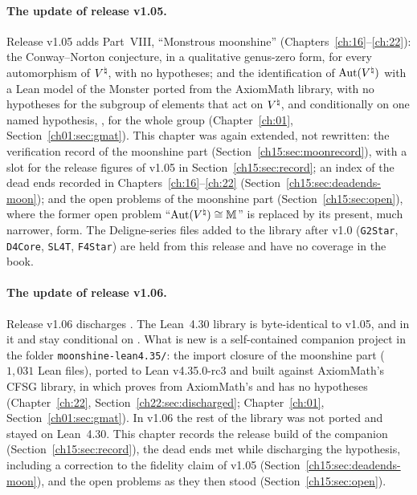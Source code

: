 \paragraph{The update of release v1.05.} Release v1.05 adds Part~VIII, ``Monstrous moonshine''
(Chapters~\ref{ch:16}--\ref{ch:22}): the Conway--Norton conjecture, in a qualitative genus-zero form, for every
automorphism of ${V^{\natural}}$, with no hypotheses; and the identification of $\operatorname{Aut}({V^{\natural}})$ with a Lean model of the Monster
ported from the AxiomMath library, with no hypotheses for the subgroup of elements that act on ${V^{\natural}}$, and conditionally
on one named hypothesis, , for the whole group (Chapter~\ref{ch:01}, Section~\ref{ch01:sec:gmat}). This
chapter was again extended, not rewritten: the verification record of the moonshine part
(Section~\ref{ch15:sec:moonrecord}), with a slot for the release figures of v1.05 in Section~\ref{ch15:sec:record}; an
index of the dead ends recorded in Chapters~\ref{ch:16}--\ref{ch:22} (Section~\ref{ch15:sec:deadends-moon}); and the open
problems of the moonshine part (Section~\ref{ch15:sec:open}), where the former open problem ``$\operatorname{Aut}({V^{\natural}})\cong\mathbb M$''
is replaced by its present, much narrower, form. The Deligne-series files added to the library after v1.0 (\texttt{G2Star},
\texttt{D4Core}, \texttt{SL4T}, \texttt{F4Star}) are held from this release and have no
coverage in the book.

\paragraph{The update of release v1.06.} Release v1.06 discharges . The Lean~4.30 library is
byte-identical to v1.05, and in it  and  stay conditional on
. What is new is a self-contained companion project in the folder \texttt{moonshine-lean4.35/}: the
import closure of the moonshine part ($1{,}031$ Lean files), ported to Lean v4.35.0-rc3 and built against AxiomMath's
CFSG library, in which  proves  from AxiomMath's  and
 has no hypotheses (Chapter~\ref{ch:22}, Section~\ref{ch22:sec:discharged};
Chapter~\ref{ch:01}, Section~\ref{ch01:sec:gmat}). In v1.06 the rest of the library was not ported and stayed on
Lean~4.30. This chapter records the release build of the companion (Section~\ref{ch15:sec:record}), the dead ends met
while discharging the hypothesis, including a correction to the fidelity claim of v1.05
(Section~\ref{ch15:sec:deadends-moon}), and the open problems as they then stood (Section~\ref{ch15:sec:open}).

